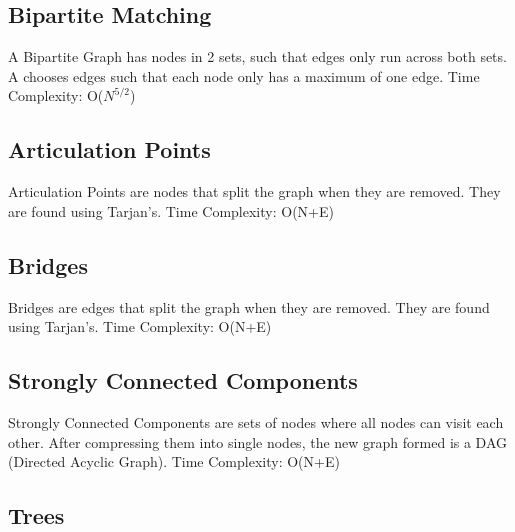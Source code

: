 \documentclass{article}
\begin{document}
\subsection{Bipartite Matching}
\begin{flushleft}
A Bipartite Graph has nodes in 2 sets, such that edges only run across both sets.
A chooses edges such that each node only has a maximum of one edge.
\newline
Time Complexity: O($N^{5/2}$)
\end{flushleft}


\subsection{Articulation Points}
\begin{flushleft}
Articulation Points are nodes that split the graph when they are removed.
They are found using Tarjan's.
\newline
Time Complexity: O(N+E)
\end{flushleft}


\subsection{Bridges}
\begin{flushleft}
Bridges are edges that split the graph when they are removed.
They are found using Tarjan's.
\newline
Time Complexity: O(N+E)
\end{flushleft}


\subsection{Strongly Connected Components}
\begin{flushleft}
Strongly Connected Components are sets of nodes where all nodes can
visit each other. After compressing them into single nodes, the new graph
formed is a DAG (Directed Acyclic Graph).
\newline
Time Complexity: O(N+E)
\end{flushleft}


\subsection{Trees}
\end{document}
